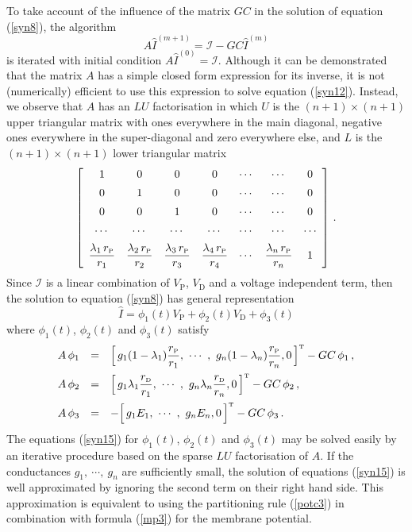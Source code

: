 To take account of the influence of the matrix $GC$ in the
solution of equation (\ref{syn8}), the algorithm
\begin{equation}\label{syn12}
A\widehat{I}^{(m+1)}=\mathcal{I}-GC\widehat{I}^{(m)}
\end{equation}
is iterated with initial condition
$A\widehat{I}^{(0)}=\mathcal{I}$. Although it can be demonstrated
that the matrix $A$ has a simple closed form expression for its
inverse, it is not (numerically) efficient to use this expression
to solve equation (\ref{syn12}). Instead, we observe that $A$ has
an $LU$ factorisation in which $U$ is the $(n+1)\times(n+1)$ upper
triangular matrix with ones everywhere in the main diagonal,
negative ones everywhere in the super-diagonal and zero everywhere
else, and $L$ is the $(n+1)\times(n+1)$ lower triangular matrix
\begin{equation}\label{syn13}
\left[\begin{array}{ccccccc}
1 & 0 & 0 & 0 & \cdots & \cdots & 0 \\[5pt]
0 & 1 & 0 & 0 & \cdots & \cdots & 0 \\[5pt]
0 & 0 & 1 & 0 & \cdots & \cdots & 0 \\[5pt]
\cdots & \cdots & \cdots & \cdots & \cdots & \cdots & \cdots \\[5pt]
\displaystyle\frac{\lambda_1\,r_{\mbox{\tiny P}}}{r_1} &
\displaystyle\frac{\lambda_2\,r_{\mbox{\tiny P}}}{r_2} &
\displaystyle\frac{\lambda_3\,r_{\mbox{\tiny P}}}{r_3} &
\displaystyle\frac{\lambda_4\,r_{\mbox{\tiny P}}}{r_4} &
\cdots & \displaystyle\frac{\lambda_n\,r_{\mbox{\tiny P}}}{r_n} & 1
\end{array}\right]\,.
\end{equation}
Since $\mathcal{I}$ is a linear combination of $V_\mathrm{P}$,
$V_\mathrm{D}$ and a voltage independent term, then the solution
to equation (\ref{syn8}) has general representation
\begin{equation}\label{syn14}
\widehat{I} = \phi_1(t)V_\mathrm{P} +
\phi_2(t)V_\mathrm{D}+\phi_3(t)
\end{equation}
where $\phi_1(t)$, $\phi_2(t)$ and $\phi_3(t)$ satisfy
\begin{equation}\label{syn15}
\begin{array}{rcl}
A\,\phi_1 & = & \Big[\,g_1(1-\lambda_1)\ds\frac{r_\mathrm{P}}{r_1}
,\ \cdots \ ,\ g_n(1-\lambda_n)\ds\frac{r_\mathrm{P}}{r_n},0\,\Big]^\mathrm{T}
-GC\,\phi_1\,,\\[10pt]
A\,\phi_2 & = & \Big[\,g_1\lambda_1\ds\frac{r_\mathrm{D}}{r_1}
,\ \cdots \ ,\ g_n\lambda_n\ds\frac{r_\mathrm{D}}{r_n},0\,\Big]^\mathrm{T}-GC\,\phi_2\,,\\[10pt]
A\,\phi_3 & = & -\Big[\,g_1E_1,\ \cdots \ ,\
g_nE_n,0\,\Big]^\mathrm{T}-GC\,\phi_3\,.
\end{array}
\end{equation}
The equations (\ref{syn15}) for $\phi_1(t)$, $\phi_2(t)$ and
$\phi_3(t)$ may be solved easily by an iterative procedure based
on the sparse $LU$ factorisation of $A$. If the conductances
$g_1,\ \cdots ,\ g_n$ are sufficiently small, the solution of
equations (\ref{syn15}) is well approximated by ignoring the
second term on their right hand side. This approximation is
equivalent to using the partitioning rule (\ref{potc3}) in
combination with formula (\ref{mp3}) for the membrane potential.

